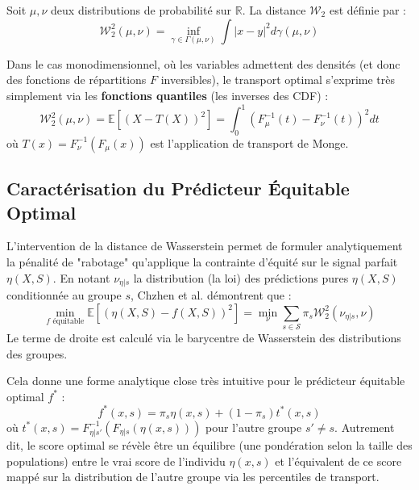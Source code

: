 \begin{definition}
Soit $\mu, \nu$ deux distributions de probabilité sur $\mathbb{R}$. La distance $\mathcal{W}_2$ est définie par :
\begin{equation}
    \mathcal{W}_2^2(\mu, \nu) = \inf_{\gamma \in \Gamma(\mu, \nu)} \int |x - y|^2 d\gamma(\mu, \nu)
\end{equation}
\end{definition}
Dans le cas monodimensionnel, où les variables admettent des densités (et donc des fonctions de répartitions $F$ inversibles), le transport optimal s'exprime très simplement via les \textbf{fonctions quantiles} (les inverses des CDF) :
\begin{equation}
    \mathcal{W}_2^2(\mu, \nu) = \mathbb{E} \left[ (X - T(X))^2 \right] = \int_0^1 \left( F_\mu^{-1}(t) - F_\nu^{-1}(t) \right)^2 dt
\end{equation}
où $T(x) = F_\nu^{-1}(F_\mu(x))$ est l'application de transport de Monge.

\subsection{Caractérisation du Prédicteur Équitable Optimal}
L'intervention de la distance de Wasserstein permet de formuler analytiquement la pénalité de "rabotage" qu'applique la contrainte d'équité sur le signal parfait $\eta(X,S)$.
En notant $\nu_{\eta|s}$ la distribution (la loi) des prédictions pures $\eta(X,S)$ conditionnée au groupe $s$, Chzhen et al. démontrent que :
\begin{equation}
    \min_{f \text{ équitable}} \mathbb{E}[(\eta(X,S) - f(X,S))^2] = \min_{\nu} \sum_{s \in \mathcal{S}} \pi_s \mathcal{W}_2^2(\nu_{\eta|s}, \nu)
\end{equation}
Le terme de droite est calculé via le barycentre de Wasserstein des distributions des groupes.

Cela donne une forme analytique close très intuitive pour le prédicteur équitable optimal $f^*$ :
\begin{equation}
    f^*(x, s) = \pi_s \eta(x, s) + (1 - \pi_s) t^*(x, s)
\end{equation}
où $t^*(x, s) = F_{\eta|s'}^{-1} \left( F_{\eta|s}(\eta(x, s)) \right)$ pour l'autre groupe $s' \neq s$. Autrement dit, le score optimal se révèle être un équilibre (une pondération selon la taille des populations) entre le vrai score de l'individu $\eta(x,s)$ et l'équivalent de ce score mappé sur la distribution de l'autre groupe via les percentiles de transport.

